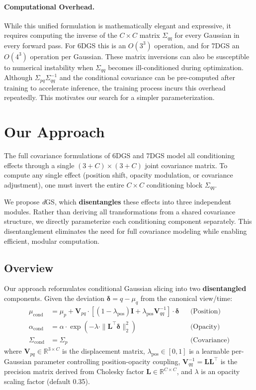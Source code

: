 \documentclass{article}
\newcommand{\modelname}{\textit{d}GS}
\begin{document}
\paragraph{Computational Overhead.} While this unified formulation is mathematically elegant and expressive, it requires computing the inverse of the $C \times C$ matrix $\Sigma_{qq}$ for every Gaussian in every forward pass. For 6DGS this is an $O(3^3)$ operation, and for 7DGS an $O(4^3)$ operation per Gaussian. These matrix inversions can also be susceptible to numerical instability when $\Sigma_{qq}$ becomes ill-conditioned during optimization. Although $\Sigma_{pq}\Sigma_{qq}^{-1}$ and the conditional covariance can be pre-computed after training to accelerate inference, the training process incurs this overhead repeatedly. This motivates our search for a simpler parameterization.

\section{Our Approach}

The full covariance formulations of 6DGS and 7DGS model all conditioning effects through a single $(3+C) \times (3+C)$ joint covariance matrix. To compute any single effect (position shift, opacity modulation, or covariance adjustment), one must invert the entire $C \times C$ conditioning block $\Sigma_{qq}$.

We propose \modelname{}, which \textbf{disentangles} these effects into three independent modules. Rather than deriving all transformations from a shared covariance structure, we directly parameterize each conditioning component separately. This disentanglement eliminates the need for full covariance modeling while enabling efficient, modular computation.

\subsection{Overview}



Our approach reformulates conditional Gaussian slicing into two \textbf{disentangled} components. Given the deviation $\boldsymbol{\delta} = q - \mu_q$ from the canonical view/time:
\begin{align}
\mu_{\text{cond}} &= \mu_p + \mathbf{V}_{pq} \cdot \left[(1-\lambda_\text{pos}) \mathbf{I} + \lambda_\text{pos} \mathbf{V}_{qq}^{-1}\right] \cdot \boldsymbol{\delta} & &\text{(Position)} \\
\alpha_{\text{cond}} &= \alpha \cdot \exp\left(-\lambda \cdot \|\mathbf{L}^\top \boldsymbol{\delta}\|_2^2\right) & &\text{(Opacity)} \\
\Sigma_{\text{cond}} &= \Sigma_p & &\text{(Covariance)}
\end{align}
where $\mathbf{V}_{pq} \in \mathbb{R}^{3 \times C}$ is the displacement matrix, $\lambda_\text{pos} \in [0,1]$ is a learnable per-Gaussian parameter controlling position-opacity coupling, $\mathbf{V}_{qq}^{-1} = \mathbf{L}\mathbf{L}^\top$ is the precision matrix derived from Cholesky factor $\mathbf{L} \in \mathbb{R}^{C \times C}$, and $\lambda$ is an opacity scaling factor (default 0.35).
\end{document}
